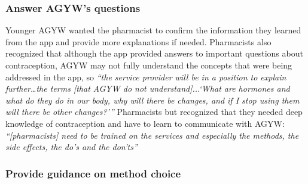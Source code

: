 \subsubsection{Answer AGYW’s questions}

 Younger AGYW wanted the pharmacist to confirm the information they learned from the app and provide more explanations if needed. Pharmacists also recognized that although the app provided answers to important questions about contraception, AGYW may not fully understand the concepts that were being addressed in the app, so \textit{``the service provider will be in a position to explain further…the terms [that AGYW do not understand]...`What are hormones and what do they do in our body, why will there be changes, and if I stop using them will there be other changes?'”}  Pharmacists  but recognized that they needed deep knowledge of contraception and have to learn to communicate with AGYW: \textit{``[pharmacists] need to be trained on the services and especially the methods, the side effects, the do’s and the don'ts\ladd{}”}  

\subsubsection{Provide guidance on method choice}

